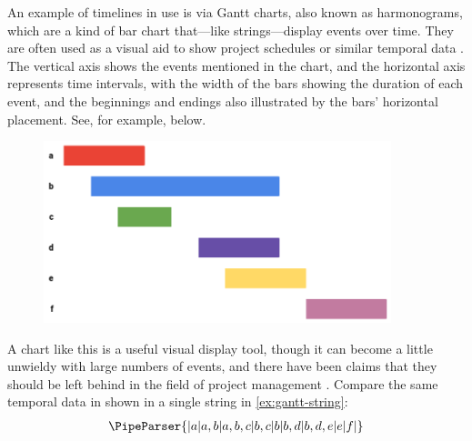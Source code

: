 \documentclass[a4paper,12pt,leqno]{article}
\newcommand{\vph}[1]{\vphantom{#1}}
\newcommand{\ebox}[1]{\fbox{$\vph{'(),}#1$}}
\newcommand{\EventString}[1]{%
	\renewcommand*{\do}[1]{\ebox{##1}}%
	\PipeParser{#1}%
}
\begin{document}
An example of timelines in use is via Gantt charts, also known as harmonograms, which are a kind of bar chart that---like strings---display events over time. They are often used as a visual aid to show project schedules or similar temporal data \citep{kumar2005effective}. %
The vertical axis shows the events mentioned in the chart, and the horizontal axis represents time intervals, with the width of the bars showing the duration of each event, and the beginnings and endings also illustrated by the bars' horizontal placement. See, for example,  below.

\begin{center}
	\begin{figure}[h!]
		\centering
		\includegraphics[width=0.9\textwidth]{images/gantt-chart-example.png}
		\label{ex:gantt-chart}
	\end{figure}
\end{center}
A chart like this is a useful visual display tool, though it can become a little unwieldy with large numbers of events, and there have been claims that they should be left behind in the field of project management \citep{maylor2001beyond}. Compare the same temporal data in  shown in a single string in \cref{ex:gantt-string}:
\begin{align}\label{ex:gantt-string}
	\EventString{{}|a|a,b|a,b,c|b,c|b|b,d|b,d,e|e|f|{}}
\end{align}
\end{document}
